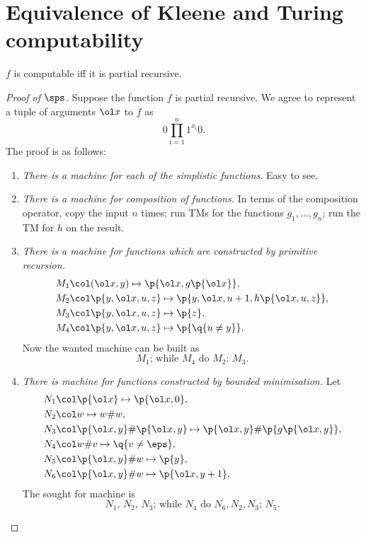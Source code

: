 \section{Equivalence of Kleene and Turing computability}

\begin{theorem}
  $f$ is computable iff it is partial recursive.
\end{theorem}

\begin{proof}[Proof of $\sps$]
  Suppose the function $f$ is partial recursive.
  We agree to represent a tuple of arguments $\ol x$ to $f$ as
  $$ 0 \prod_{i=1}^n 1^{x_i} 0. $$
  The proof is as follows:
  \begin{enumerate}
    \item \emph{There is a machine for each of the simplistic functions.} Easy to see.
    \item \emph{There is a machine for composition of functions.} In terms of the composition operator,
    copy the input $n$ times; 
  run TMs for the functions $g_1, \dots, g_n$;
  run the TM for $h$ on the result.
    \item \emph{There is a machine for functions which are constructed by primitive recursion.}
    \begin{align*}
      M_1 \col & (\ol x, y) \mapsto \p{\ol x, g\p{\ol x}}, \\
      M_2 \col & \p{y, \ol x, u, z} \mapsto \p{y, \ol x, u+1, h\p{\ol x, u, z}}, \\
      M_3 \col & \p{y, \ol x, u, z} \mapsto \p{z}, \\
      M_4 \col & \p{y, \ol x, u, z} \mapsto \p{\q{u \ne y}}.
    \end{align*}
    Now the wanted machine can be built as
    $$ \text{$M_1$; while $M_4$ do $M_2$; $M_3$}. $$
    \item \emph{There is machine for functions constructed by bounded minimisation.}
    Let
    \begin{align*}
      N_1 \col & \p{\ol x} \mapsto \p{\ol x, 0}, \\
      N_2 \col & w \mapsto w \# w, \\
      N_3 \col & \p{\ol x, y} \# \p{\ol x, y} \mapsto \p{\ol x, y} \# \p{g\p{\ol x, y}}, \\
      N_4 \col & w \# v \mapsto \q{v \ne \eps}, \\
      N_5 \col & \p{\ol x, y} \# w \mapsto \p{y}, \\
      N_6 \col & \p{\ol x, y} \# w \mapsto \p{\ol x, y+1}.
    \end{align*}
    The sought for machine is
    $$ \text{$N_1$, $N_2$, $N_3$; while $N_4$ do $N_6, N_2, N_3$; $N_5$}. $$
  \end{enumerate}
\end{proof}

